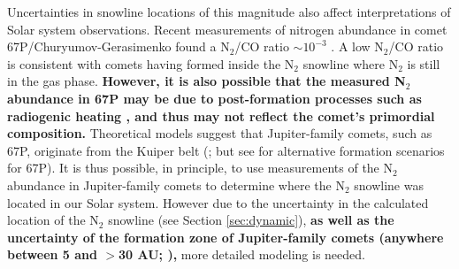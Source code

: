 \documentclass[apj]{emulateapj}
\begin{document}

Uncertainties in snowline locations of this magnitude also affect interpretations of Solar system observations. Recent measurements of nitrogen abundance in comet 67P/Churyumov-Gerasimenko found a N$_2$/CO ratio $\sim 10^{-3}$ \citep{rubin15}. A low N$_2$/CO ratio is consistent with comets having formed inside the N$_2$ snowline where N$_2$ is still in the gas phase. \textbf{However, it is also possible that the measured N$_2$ abundance in 67P may be due to post-formation processes such as radiogenic heating \citep{rubin15}, and thus may not reflect the comet's primordial composition.} Theoretical models suggest that Jupiter-family comets, such as 67P, originate from the Kuiper belt (\citealt{duncan97}; but see \citealt{rubin15} for alternative formation scenarios for 67P). It is thus possible, in principle, to use measurements of the N$_2$ abundance in Jupiter-family comets to determine where the N$_2$ snowline was located in our Solar system. However due to the uncertainty in the calculated location of the N$_2$ snowline (see Section \ref{sec:dynamic}), \textbf{as well as the uncertainty of the formation zone of Jupiter-family comets (anywhere between 5 and $>$30 AU; \citealt{pontoppidan14}),} more detailed modeling is needed. 

\end{document}
